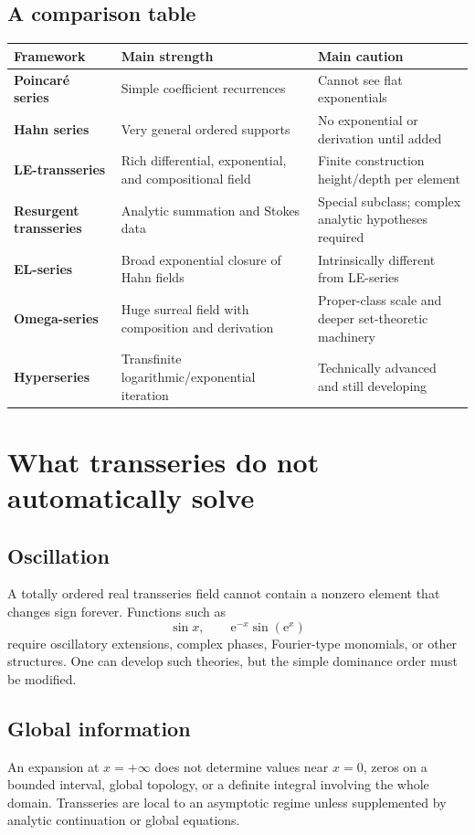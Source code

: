 \documentclass[11pt,openany]{book}
\theoremstyle{plain}
\theoremstyle{definition}
\theoremstyle{remark}
\newcommand{\e}{\mathrm{e}}
\begin{document}
\section{A comparison table}
\begin{center}
\small
\begin{tabularx}{\textwidth}{>{\bfseries}p{}X X}
\toprule
Framework & Main strength & Main caution\\
\midrule
Poincar\'e series & Simple coefficient recurrences & Cannot see flat exponentials\\
Hahn series & Very general ordered supports & No exponential or derivation until added\\
LE-transseries & Rich differential, exponential, and compositional field & Finite construction height/depth per element\\
Resurgent transseries & Analytic summation and Stokes data & Special subclass; complex analytic hypotheses required\\
EL-series & Broad exponential closure of Hahn fields & Intrinsically different from LE-series\\
Omega-series & Huge surreal field with composition and derivation & Proper-class scale and deeper set-theoretic machinery\\
Hyperseries & Transfinite logarithmic/exponential iteration & Technically advanced and still developing\\
\bottomrule
\end{tabularx}
\end{center}

\chapter{What transseries do not automatically solve}
\label{chap:limits}

\section{Oscillation}
A totally ordered real transseries field cannot contain a nonzero element that changes sign forever. Functions such as
\[
  \sin x,
  \qquad
  \e^{-x}\sin(\e^x)
\]
require oscillatory extensions, complex phases, Fourier-type monomials, or other structures. One can develop such theories, but the simple dominance order must be modified.

\section{Global information}
An expansion at $x=+\infty$ does not determine values near $x=0$, zeros on a bounded interval, global topology, or a definite integral involving the whole domain. Transseries are local to an asymptotic regime unless supplemented by analytic continuation or global equations.
\end{document}
